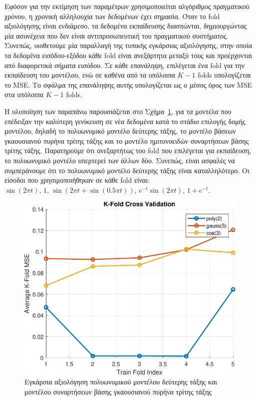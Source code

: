 \documentclass[a4paper,12pt]{article}
\begin{document}
Εφόσον για την εκτίμηση των παραμέτρων χρησιμοποιείται αλγόριθμος πραγματικού χρόνου, η χρονική αλληλουχία
των δεδομένων έχει σημασία. Όταν το fold αξιολόγησης είναι
ενδιάμεσο, τα δεδομένα εκπαίδευσης διασπώνται, δημιουργώντας μία ασυνέχεια που δεν είναι αντιπροσωπευτική
του πραγματικού συστήματος. Συνεπώς, υιοθετούμε μία παραλλαγή της τυπικής εγκάρσιας αξιολόγησης, στην οποία 
τα δεδομένα εισόδου-εξόδου κάθε fold είναι ανεξάρτητα μεταξύ τους 
και προέρχονται από διαφορετικά σήματα εισόδου. Σε κάθε επανάληψη, επιλέγεται ένα 
fold για την εκπαίδευση του μοντέλου, ενώ σε καθένα από τα 
υπόλοιπα $K-1$ folds υπολογίζεται το 
MSE. Το σφάλμα της επανάληψης αυτής υπολογίζεται ως ο μέσος όρος
των MSE στα υπόλοιπα $K-1$ 
folds. 

Η υλοποίηση των παραπάνω παρουσιάζεται στο Σχήμα~\ref{fig:task2_cross_validation}, για τα μοντέλα που 
επέδειξαν την καλύτερη γενίκευση σε νέα δεδομένα κατά το στάδιο επιλογής δομής μοντέλου, δηλαδή το 
πολυωνυμικό μοντέλο δεύτερης τάξης, το μοντέλο βάσεων γκαουσιανού πυρήνα τρίτης τάξης και το μοντέλο 
ημιτονοειδών συναρτήσεων βάσης τρίτης τάξης. Παρατηρούμε ότι ανεξαρτήτως του 
fold που επιλέγεται για εκπαίδευση, το πολυωνυμικό μοντέλο 
υπερτερεί των άλλων δύο. Συνεπώς, είναι ασφαλές να συμπεράνουμε ότι το πολυωνυμικό μοντέλο δεύτερης τάξης 
είναι καταλληλότερο. Οι είσοδοι που χρησιμοποιήθηκαν σε κάθε 
fold είναι: 
$\sin(2 \pi t), \, 1, \, \sin(2 \pi t + \sin(0.5 \pi t)), \, e^{-t} \sin(2 \pi t), \, 1 + e^{-t}$.

\begin{figure}
    \centering
    \includegraphics[width=0.5\linewidth]{plot/task2_cross_validation.pdf}
    \caption{Εγκάρσια αξιολόγηση πολυωνυμικού μοντέλου δεύτερης τάξης και μοντέλου συναρτήσεων 
    βάσης γκαουσιανού πυρήνα τρίτης τάξης}
    \label{fig:task2_cross_validation}
\end{figure}
\end{document}
